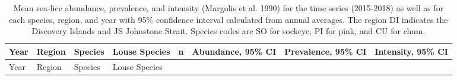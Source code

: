\documentclass[fleqn,10pt]{wlpeerj} %
\begin{document}
\begin{longtable}[]{@{}llllrlll@{}}
\caption{\label{tab:sealice-table} Mean sea-lice abundance, prevalence, and
intensity (Margolis et al. 1990) for the time series (2015-2018) as well
as for each species, region, and year with 95\% confidence interval
calculated from annual averages. The region DI indicates the Discovery
Islands and JS Johnstone Strait. Species codes are SO for sockeye, PI
for pink, and CU for chum.}\tabularnewline
\toprule
\begin{minipage}[b]{0.09\columnwidth}\raggedright\strut
Year\strut
\end{minipage} & \begin{minipage}[b]{0.06\columnwidth}\raggedright\strut
Region\strut
\end{minipage} & \begin{minipage}[b]{0.06\columnwidth}\raggedright\strut
Species\strut
\end{minipage} & \begin{minipage}[b]{0.11\columnwidth}\raggedright\strut
Louse Species\strut
\end{minipage} & \begin{minipage}[b]{0.04\columnwidth}\raggedleft\strut
n\strut
\end{minipage} & \begin{minipage}[b]{0.14\columnwidth}\raggedright\strut
Abundance, 95\% CI\strut
\end{minipage} & \begin{minipage}[b]{0.14\columnwidth}\raggedright\strut
Prevalence, 95\% CI\strut
\end{minipage} & \begin{minipage}[b]{0.14\columnwidth}\raggedright\strut
Intensity, 95\% CI\strut
\end{minipage}\tabularnewline
\midrule
\endfirsthead
\toprule
\begin{minipage}[b]{0.09\columnwidth}\raggedright\strut
Year\strut
\end{minipage} & \begin{minipage}[b]{0.06\columnwidth}\raggedright\strut
Region\strut
\end{minipage} & \begin{minipage}[b]{0.06\columnwidth}\raggedright\strut
Species\strut
\end{minipage} & \begin{minipage}[b]{0.11\columnwidth}\raggedright\strut
Louse Species\strut
\end{minipage} & \begin{minipage}[b]{0.04\columnwidth}\raggedleft\strut

\end{minipage}
\end{longtable}
\end{document}
